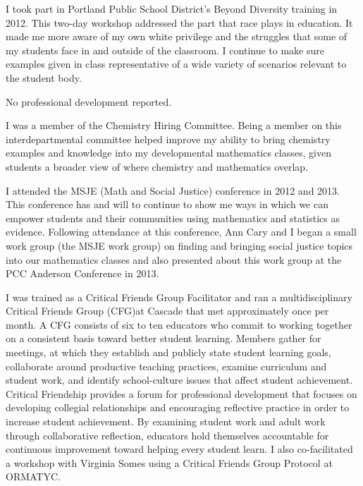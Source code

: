 \begin{description}[style=nextline]
	I took part in Portland Public School District's Beyond Diversity training
	in 2012. This two-day workshop addressed the part that race plays in education.
	It made me more aware of my own white privilege and the struggles that some of
	my students face in and outside of the classroom. I continue to make sure
	examples given in class representative of a wide variety of scenarios relevant
	to the student body.

	\item[Phil Thurber (Full-time Instructor, Sylvania Campus)]

	No professional development reported.

	\item[Emiliano Vega (Full Time Instructor, Sylvania Camps)]
	I was a member of the Chemistry Hiring Committee. Being a member on this
	interdepartmental committee helped improve my ability to bring chemistry
	examples and knowledge into my developmental mathematics classes, given
	students a broader view of where chemistry and mathematics overlap.

	I attended the MSJE (Math and Social Justice) conference in 2012 and 2013. This
	conference has and will to continue to show me ways in which we can empower
	students and their communities using mathematics and statistics as evidence.
	Following attendance at this conference, Ann Cary and I began a small work
	group (the MSJE work group) on finding and bringing social justice topics into
	our mathematics classes and also presented about this work group at the PCC
	Anderson Conference in 2013.

	\item[Carly Vollet (Full-time Instructor, Cascade Campus)]
	I was trained as a Critical Friends Group Facilitator and ran a
	multidisciplinary Critical Friends Group (CFG)at Cascade that met approximately
	once per month. A CFG consists of six to ten educators who commit to working
	together on a consistent basis toward better student learning. Members gather
	for meetings, at which they establish and publicly state student learning
	goals, collaborate around productive teaching practices, examine curriculum and
	student work, and identify school-culture issues that affect student
	achievement. Critical Friendship provides a forum for professional development
	that focuses on developing collegial relationships and encouraging reflective
	practice in order to increase student achievement.  By examining student work
	and adult work through collaborative reflection, educators hold themselves
	accountable for continuous improvement toward helping every student learn.  I
	also co-facilitated a workshop with Virginia Somes using a Critical Friends Group Protocol at ORMATYC.


\end{description}
